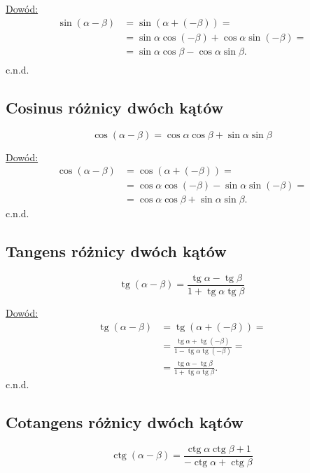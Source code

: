 \documentclass[12pt,a4paper,fleqn]{article}
\DeclareMathOperator{\tg}{tg}
\DeclareMathOperator{\ctg}{ctg}
\begin{document}
		\underline{Dowód:}\noindent
		\begin{align*}
		\sin(\alpha-\beta) &= \sin(\alpha+(-\beta)) =\\
						   &= \sin\alpha\cos(-\beta)+\cos\alpha\sin(-\beta) =\\
						   &= \sin\alpha\cos\beta - \cos\alpha\sin\beta.\\
		\end{align*}
		c.n.d.
		\subsection{Cosinus różnicy dwóch kątów}
		\begin{equation*}
			\cos(\alpha-\beta) = \cos\alpha\cos\beta + \sin\alpha\sin\beta
		\end{equation*}
		
		\underline{Dowód:}\noindent
		\begin{align*}
		\cos(\alpha-\beta) &= \cos(\alpha+(-\beta)) =\\
						   &= \cos\alpha\cos(-\beta) - \sin\alpha\sin(-\beta) =\\
						   &= \cos\alpha\cos\beta + \sin\alpha\sin\beta.
		\end{align*}
		c.n.d.

		\subsection{Tangens różnicy dwóch kątów}
		\begin{equation*}
			\tg(\alpha-\beta)= \frac{\tg \alpha - \tg \beta}{1 + \tg \alpha \tg \beta}
		\end{equation*}
		
		\underline{Dowód:}\noindent
		\begin{align*}
		\tg(\alpha-\beta) &= \tg(\alpha+(-\beta))=\\
						  &= \frac{\tg \alpha + \tg (-\beta)}{1 - \tg \alpha \tg (-\beta)} =\\
						  &= \frac{\tg \alpha - \tg \beta}{1 + \tg \alpha \tg \beta}.
		\end{align*}
		c.n.d.
		\subsection{Cotangens różnicy dwóch kątów}
		\begin{equation*}
			\ctg (\alpha - \beta) = \frac{\ctg\alpha\ctg\beta+1}{-\ctg\alpha+\ctg\beta}
		\end{equation*}
		
\end{document}
